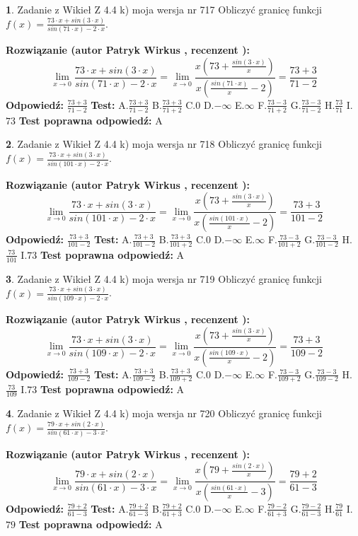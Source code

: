 \documentclass[12pt, a4paper]{article}
\theoremstyle{definition} %
\newtheorem{zad}{}
\newcommand{\zadStart}[1]{\begin{zad}#1\newline}
\newcommand{\zadStop}{\end{zad}}
\newcommand{\rozwStart}[2]{\noindent \textbf{Rozwiązanie (autor #1 , recenzent #2): }\newline}
\newcommand{\rozwStop}{\newline}
\newcommand{\odpStart}{\noindent \textbf{Odpowiedź:}\newline}
\newcommand{\odpStop}{\newline}
\newcommand{\testStart}{\noindent \textbf{Test:}\newline}
\newcommand{\testStop}{\newline}
\newcommand{\kluczStart}{\noindent \textbf{Test poprawna odpowiedź:}\newline}
\newcommand{\kluczStop}{\newline}
\begin{document}
\zadStart{Zadanie z Wikieł Z 4.4 k) moja wersja nr 717}
Obliczyć granicę funkcji $f(x)=\frac{73\cdot x +sin(3\cdot x)}{sin(71\cdot x) -2\cdot x}$.
\zadStop
\rozwStart{Patryk Wirkus}{}
$$\lim\limits_{x\to 0}\frac{73\cdot x +sin(3\cdot x)}{sin(71\cdot x) -2\cdot x}
=\lim\limits_{x\to 0}\frac{x(73+\frac{sin(3\cdot x)}{x})}{x(\frac{sin(71\cdot x)}{x}-2)}
=\frac{73+3}{71-2}$$
\rozwStop
\odpStart
$\frac{73+3}{71-2}$
\odpStop
\testStart
A.$\frac{73+3}{71-2}$
B.$\frac{73+3}{71+2}$
C.$0$
D.$-\infty$
E.$\infty$
F.$\frac{73-3}{71+2}$
G.$\frac{73-3}{71-2}$
H.$\frac{73}{71}$
I.$73$
\testStop
\kluczStart
A
\kluczStop



\zadStart{Zadanie z Wikieł Z 4.4 k) moja wersja nr 718}
Obliczyć granicę funkcji $f(x)=\frac{73\cdot x +sin(3\cdot x)}{sin(101\cdot x) -2\cdot x}$.
\zadStop
\rozwStart{Patryk Wirkus}{}
$$\lim\limits_{x\to 0}\frac{73\cdot x +sin(3\cdot x)}{sin(101\cdot x) -2\cdot x}
=\lim\limits_{x\to 0}\frac{x(73+\frac{sin(3\cdot x)}{x})}{x(\frac{sin(101\cdot x)}{x}-2)}
=\frac{73+3}{101-2}$$
\rozwStop
\odpStart
$\frac{73+3}{101-2}$
\odpStop
\testStart
A.$\frac{73+3}{101-2}$
B.$\frac{73+3}{101+2}$
C.$0$
D.$-\infty$
E.$\infty$
F.$\frac{73-3}{101+2}$
G.$\frac{73-3}{101-2}$
H.$\frac{73}{101}$
I.$73$
\testStop
\kluczStart
A
\kluczStop



\zadStart{Zadanie z Wikieł Z 4.4 k) moja wersja nr 719}
Obliczyć granicę funkcji $f(x)=\frac{73\cdot x +sin(3\cdot x)}{sin(109\cdot x) -2\cdot x}$.
\zadStop
\rozwStart{Patryk Wirkus}{}
$$\lim\limits_{x\to 0}\frac{73\cdot x +sin(3\cdot x)}{sin(109\cdot x) -2\cdot x}
=\lim\limits_{x\to 0}\frac{x(73+\frac{sin(3\cdot x)}{x})}{x(\frac{sin(109\cdot x)}{x}-2)}
=\frac{73+3}{109-2}$$
\rozwStop
\odpStart
$\frac{73+3}{109-2}$
\odpStop
\testStart
A.$\frac{73+3}{109-2}$
B.$\frac{73+3}{109+2}$
C.$0$
D.$-\infty$
E.$\infty$
F.$\frac{73-3}{109+2}$
G.$\frac{73-3}{109-2}$
H.$\frac{73}{109}$
I.$73$
\testStop
\kluczStart
A
\kluczStop



\zadStart{Zadanie z Wikieł Z 4.4 k) moja wersja nr 720}
Obliczyć granicę funkcji $f(x)=\frac{79\cdot x +sin(2\cdot x)}{sin(61\cdot x) -3\cdot x}$.
\zadStop
\rozwStart{Patryk Wirkus}{}
$$\lim\limits_{x\to 0}\frac{79\cdot x +sin(2\cdot x)}{sin(61\cdot x) -3\cdot x}
=\lim\limits_{x\to 0}\frac{x(79+\frac{sin(2\cdot x)}{x})}{x(\frac{sin(61\cdot x)}{x}-3)}
=\frac{79+2}{61-3}$$
\rozwStop
\odpStart
$\frac{79+2}{61-3}$
\odpStop
\testStart
A.$\frac{79+2}{61-3}$
B.$\frac{79+2}{61+3}$
C.$0$
D.$-\infty$
E.$\infty$
F.$\frac{79-2}{61+3}$
G.$\frac{79-2}{61-3}$
H.$\frac{79}{61}$
I.$79$
\testStop
\kluczStart
A
\kluczStop
\end{document}
